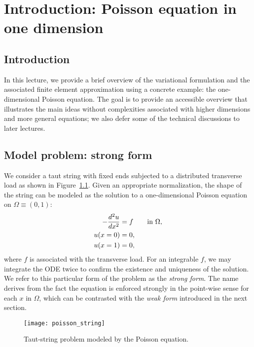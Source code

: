\chapter{Introduction: Poisson equation in one dimension}

\disclaimer

\section{Introduction}
In this lecture, we provide a brief overview of the variational formulation and the associated finite element approximation using a concrete example: the one-dimensional Poisson equation. The goal is to provide an accessible overview that illustrates the main ideas without complexities associated with higher dimensions and more general equations; we also defer some of the technical discussions to later lectures.

\section{Model problem: strong form}
\label{sec:pos1d_strong}
We consider a taut string with fixed ends subjected to a distributed transverse load as shown in Figure~\ref{fig:pos1d_string}.  Given an appropriate normalization, the shape of the string can be modeled as the solution to a one-dimensional Poisson equation on $\Omega \equiv (0,1)$: %
\begin{align}
  - \frac{d ^2u}{d x^2} &= f \qquad \text{in } \Omega,  \label{eq:pos1d_strong} \\
  u(x=0) &= 0 \notag , \\
  u(x=1) &= 0 \notag ,
\end{align}
where $f$ is associated with the transverse load.  For an integrable $f$, we may integrate the ODE twice to confirm the existence and uniqueness of the solution.  We refer to this particular form of the problem as the \emph{strong form}.  The name derives from the fact the equation is enforced strongly in the point-wise sense for each $x$ in $\Omega$, which can be contrasted with the \emph{weak form} introduced in the next section. %

\begin{figure}
  \centering
  \texttt{[image: poisson\_string]}
  \caption{Taut-string problem modeled by the Poisson equation. \label{fig:pos1d_string}}
\end{figure}

